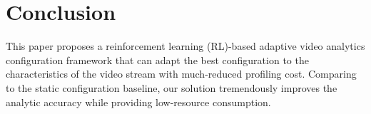 \section{Conclusion}
\label{Section: conclusion}

%
%

This paper proposes a reinforcement learning (RL)-based adaptive video analytics configuration framework that can adapt the best configuration to the characteristics of the video stream with much-reduced profiling cost. Comparing to the static configuration baseline, our solution tremendously improves the analytic accuracy while providing low-resource consumption.
